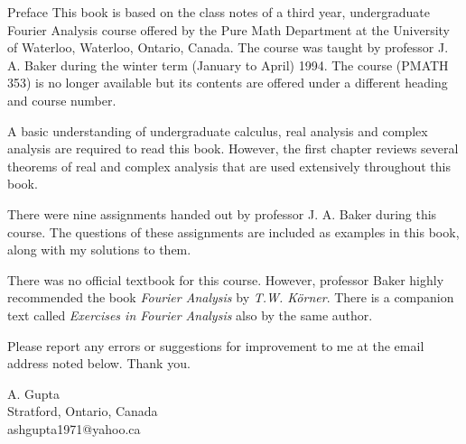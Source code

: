 \begin{chapter}{Preface}
This book is based on the class notes of a third year, undergraduate Fourier Analysis course offered by the Pure Math Department at the University of Waterloo, Waterloo, Ontario, Canada. The course was taught by professor J. A. Baker during the winter term (January to April) 1994. The course (PMATH 353) is no longer available but its contents are offered under a different heading and course number.

A basic understanding of undergraduate calculus, real analysis and complex analysis are required to read this book. However, the first chapter reviews 
several theorems of real and complex analysis that are used extensively throughout
this book.

There were nine assignments handed out by professor J. A. Baker during this course. The questions of these assignments are included as examples in this book, along with my solutions to them.

There was no official textbook for this course. However, professor Baker highly
recommended the book \emph{Fourier Analysis} by \emph{T.W. K\"{o}rner}.
There is a companion text called \emph{Exercises in Fourier Analysis} also by the
same author.

Please report any errors or suggestions for improvement to me at the email address noted below. Thank you.

\bigskip
\begin{flushright}
A. Gupta\\
Stratford, Ontario, Canada\\
ashgupta1971@yahoo.ca
\end{flushright}

\end{chapter}